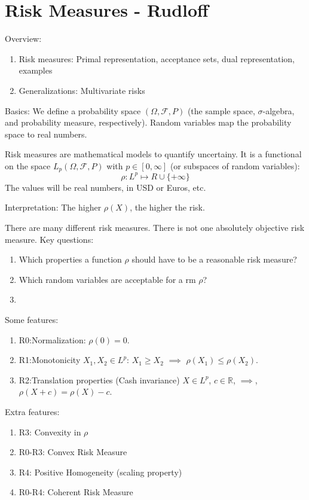 \chapter{Risk Measures - Rudloff}
Overview:
\begin{enumerate}
	\item Risk measures: Primal representation, acceptance sets, dual representation, examples
	\item Generalizations: Multivariate risks 
\end{enumerate}

Basics:
We define a probability space $(\Omega,\mathcal{F}, P)$ (the sample space, $\sigma$-algebra, and probability measure, respectively).
Random variables map the probability space to real numbers.

Risk measures are mathematical models to quantify uncertainy. It is a functional on the space $L_p(\Omega,\mathcal{F}, P)$ with $p\in[0,\infty]$ (or subspaces of random variables):
\begin{equation}
	\rho : L^p \mapsto R\cup \{+\infty \}
\end{equation} 
The values will be real numbers, in USD or Euros, etc.

Interpretation: The higher $\rho(X)$, the higher the risk.

There are many different risk measures. There is not one absolutely objective risk measure. Key questions:
\begin{enumerate}
	\item Which properties a function $\rho$ should have to be a reasonable risk measure?
	\item Which random variables are acceptable for a rm $\rho$?
	\item 
\end{enumerate}

Some features:
\begin{enumerate}
	\item R0:Normalization: $\rho(0)=0$.
	\item R1:Monotonicity $X_1,X_2\in L^p$: $X_1\geq X_2$ $\implies$ $\rho(X_1)\leq \rho(X_2)$.
	\item R2:Translation properties (Cash invariance) $X\in L^p$, $c\in\mathbb{R}$, $\implies$, $\rho(X+c)=\rho(X)-c$.
	
\end{enumerate}

Extra features:
\begin{enumerate}
	\item R3: Convexity in $\rho$
	\item R0-R3: Convex Risk Measure
	\item R4: Positive Homogeneity (scaling property)
	\item R0-R4: Coherent Risk Measure
\end{enumerate}


